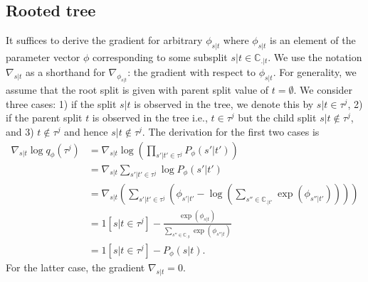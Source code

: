 \documentclass{article}
\begin{document}
\subsection*{Rooted tree}
It suffices to derive the gradient for arbitrary $\phi_{s|t}$ where $\phi_{s|t}$ is an element of the parameter vector $\phi$ corresponding to some subsplit $s|t \in \mathbb{C}_{.|t}$.
We use the notation $\nabla_{s|t}$ as a shorthand for $\nabla_{\phi_{s|t}}$: the gradient with respect to $\phi_{s|t}$.
For generality, we assume that the root split is given with parent split value of $t = \emptyset$.
We consider three cases: 1) if the split $s|t$ is observed in the tree, we denote this by $s|t \in \tau^j$, 2) if the parent split $t$ is observed in the tree i.e., $t \in \tau^j$ but the child split $s|t \notin \tau^j$, and 3) $t \notin \tau^j$ and hence $s|t \notin \tau^j$.
The derivation for the first two cases is
\begin{align*}
    \nabla_{s|t} \log q_{\phi}(\tau^j) &= \nabla_{s|t} \log \left(\prod_{s'|t' \in \tau^j} P_{\phi}(s' | t') \right) \\
    &= \nabla_{s|t} \sum\limits_{s'|t' \in \tau^j} \log P_{\phi}(s' | t') \\
    &= \nabla_{s|t} \left(\sum\limits_{s'|t' \in \tau^j} \left(\phi_{s' | t'} - \log\left(\sum\limits_{s'' \in \mathbb{C}_{.|t'}} \exp(\phi_{s''|t'})\right)\right)\right) \\
    &= 1[s|t \in \tau^{j}] - \frac{\exp(\phi_{s|t})}{\sum\limits_{s'' \in \mathbb{C}_{.|t}} \exp(\phi_{s''|t})} \\
    &= 1[s|t \in \tau^{j}] - P_{\phi}(s|t).
\end{align*}
For the latter case, the gradient $\nabla_{s|t} = 0$.
\end{document}
